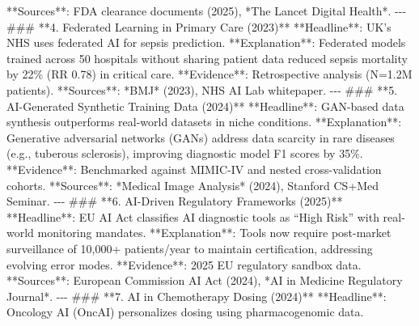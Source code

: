 \documentclass{article}%
\begin{document}
%
**Sources**: FDA clearance documents (2025), *The Lancet Digital Health*.\newline%
%
{-}{-}{-}\newline%
%
\#\#\# **4. Federated Learning in Primary Care (2023)**\newline%
%
**Headline**: UK’s NHS uses federated AI for sepsis prediction.\newline%
%
**Explanation**: Federated models trained across 50 hospitals without sharing patient data reduced sepsis mortality by 22\% (RR 0.78) in critical care.\newline%
%
**Evidence**: Retrospective analysis (N=1.2M patients).\newline%
%
**Sources**: *BMJ* (2023), NHS AI Lab whitepaper.\newline%
%
{-}{-}{-}\newline%
%
\#\#\# **5. AI{-}Generated Synthetic Training Data (2024)**\newline%
%
**Headline**: GAN{-}based data synthesis outperforms real{-}world datasets in niche conditions.\newline%
%
**Explanation**: Generative adversarial networks (GANs) address data scarcity in rare diseases (e.g., tuberous sclerosis), improving diagnostic model F1 scores by 35\%.\newline%
%
**Evidence**: Benchmarked against MIMIC{-}IV and nested cross{-}validation cohorts.\newline%
%
**Sources**: *Medical Image Analysis* (2024), Stanford CS+Med Seminar.\newline%
%
{-}{-}{-}\newline%
%
\#\#\# **6. AI{-}Driven Regulatory Frameworks (2025)**\newline%
%
**Headline**: EU AI Act classifies AI diagnostic tools as “High Risk” with real{-}world monitoring mandates.\newline%
%
**Explanation**: Tools now require post{-}market surveillance of 10,000+ patients/year to maintain certification, addressing evolving error modes.\newline%
%
**Evidence**: 2025 EU regulatory sandbox data.\newline%
%
**Sources**: European Commission AI Act (2024), *AI in Medicine Regulatory Journal*.\newline%
%
{-}{-}{-}\newline%
%
\#\#\# **7. AI in Chemotherapy Dosing (2024)**\newline%
%
**Headline**: Oncology AI (OncAI) personalizes dosing using pharmacogenomic data.\newline%
\end{document}
